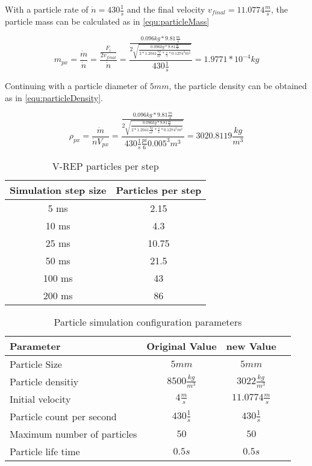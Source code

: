     With a particle rate of $\dot n = 430 \frac{1}{s}$ and the final velocity $v_{final} = 11.0774 \frac{m}{s}$, the particle mass can be calculated as in \ref{equ:particleMass}
  
   \begin{equation}
    m_{px}= \frac{\dot m}{\dot n}=\frac{\frac{F_i}{2 v_{final} }}{\dot n} = \frac{\frac{0.096 kg * 9.81 \frac{m}{s}}{2 \sqrt{\frac{ 0.096 kg * 9.81 \frac{m}{s}}{2 * 1.2041 \frac{kg}{m^3} * \frac{\pi}{4} * 0.1274^2 m^2}} }}{430 \frac{1}{s}} = 1.9771 * 10^{-4} kg
    \label{equ:particleMass}
 \end{equation}
    
    Continuing with a particle diameter of $5mm$, the particle density can be obtained as in \ref{equ:particleDensity}.
  
      
   \begin{equation}
    \rho_{px}= \frac{\dot m}{\dot n V_{px}} = \frac{\frac{0.096 kg * 9.81 \frac{m}{s}}{2 \sqrt{\frac{ 0.096 kg * 9.81 \frac{m}{s}}{2 * 1.2041 \frac{kg}{m^3} * \frac{\pi}{4} * 0.1274^2 m^2}} }}{430 \frac{1}{s} \frac{pi}{6} 0.005^3 m^3} = 3020.8119 \frac{kg}{m^3}
    \label{equ:particleDensity}
 \end{equation}
    
\begin{table}[h]
	\centering
	\begin{tabular}{|c|c|}
    		\hline
		Simulation step size & Particles per step \\
		\hline
    		5 ms & 2.15\\
    		\hline
    		10 ms & 4.3  \\
    		\hline
    		25 ms  & 10.75\\
    		\hline
    		50 ms & 21.5 \\
    		\hline
		100 ms & 43 \\
    		\hline
		200 ms & 86 \\
    		\hline
	\end{tabular}
    	\caption{V-REP particles per step}
      	\label{tab:particleNum}
\end{table}


\begin{table}[h]
	\centering
	\begin{tabular}{|l|c|c|c|}
    		\hline
		Parameter & Original Value & new Value \\
		\hline
    		Particle Size & $5 mm$ &  $5 mm$\\
    		\hline
		Particle densitiy & $ 8500 \frac{kg}{m^3} $ & $3022 \frac{kg}{m^3} $   \\
    		\hline
		Initial velocity & $ 4 \frac{m}{s}$ & $11.0774 \frac{m}{s}$  \\
    		\hline
		Particle count per second & $430 \frac{1}{s}$ & $430 \frac{1}{s}$ \\
    		\hline
		Maximum number of particles & $50$ & $50$ \\
    		\hline
		Particle life time & $0.5 s$ & $0.5s$ \\
    		\hline
	\end{tabular}
    	\caption{Particle simulation configuration parameters}
      	\label{tab:particleConf}
\end{table}

